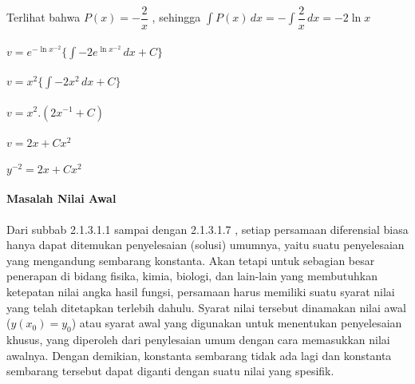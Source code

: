 \begin{enumerate}[1.]
	Terlihat bahwa \begin{math} P(x) = -\dfrac{2}{x} \end{math} , sehingga \begin{math} \int P(x) \, dx = -\int \dfrac{2}{x} \, dx = - 2 \ln x \end{math} \\ \\
	\begin{math} v = e^{-\ln x^{-2}} \bigg\{ \int -2 e^{\ln x^{-2}} \, dx + C \bigg\} \end{math} \\ \\
	\begin{math} v = x^{2} \bigg\{ \int -2x^{2} \, dx + C \bigg\} \end{math} \\ \\
	\begin{math} v = x^{2}.(2x^{-1} + C) \end{math} \\ \\
	\begin{math} v = 2x + Cx^{2} \end{math} \\ \\
	\begin{math} y^{-2} = 2x + Cx^{2} \end{math} 

\end{enumerate}

\paragraph{Masalah Nilai Awal}
\label{par:NA}

Dari subbab 2.1.3.1.1 sampai dengan 2.1.3.1.7 , setiap persamaan diferensial biasa hanya dapat ditemukan penyelesaian (solusi) umumnya, yaitu suatu penyelesaian yang mengandung sembarang konstanta. Akan tetapi untuk sebagian besar penerapan di bidang fisika, kimia, biologi, dan lain-lain yang membutuhkan ketepatan nilai angka hasil fungsi, persamaan harus memiliki suatu syarat nilai yang telah ditetapkan terlebih dahulu. Syarat nilai tersebut dinamakan nilai awal (\begin{math} y(x_0) = y_0 \end{math}) atau syarat awal yang digunakan
untuk menentukan penyelesaian khusus, yang diperoleh dari penylesaian umum dengan cara memasukkan nilai awalnya. Dengan demikian, konstanta sembarang tidak ada lagi dan konstanta sembarang tersebut dapat diganti dengan suatu nilai yang spesifik.

